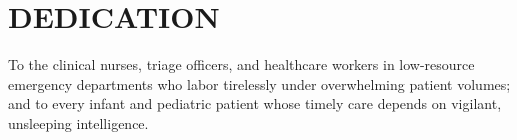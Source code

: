 \chapter*{DEDICATION}

To the clinical nurses, triage officers, and healthcare workers in low-resource emergency departments who labor tirelessly under overwhelming patient volumes; and to every infant and pediatric patient whose timely care depends on vigilant, unsleeping intelligence.